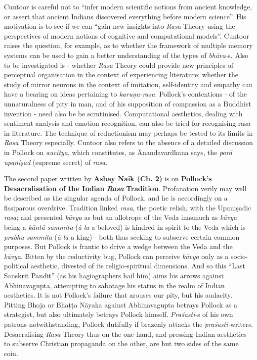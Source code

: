 Cuntoor is careful not to “infer modern scientific notions from ancient knowledge, or assert that ancient Indians discovered everything before modern science”. His motivation is to see if we can “gain new insights into \textsl{Rasa} Theory using the perspectives of modern notions of cognitive and computational models”. Cuntoor raises the question, for example, as to whether the framework of multiple memory systems can be used to gain a better understanding of the types of \textsl{bhāva}-s. Also to be investigated is - whether \textsl{Rasa} Theory could provide new principles of perceptual organisation in the context of experiencing literature; whether the study of mirror neurons in the context of imitation, self-identity and empathy can have a bearing on ideas pertaining to \textsl{karuṇa-rasa}. Pollock's contentions - of the unnaturalness of pity in man, and of his supposition of compassion as a Buddhist invention - need also be be scrutinised. Computational aesthetics, dealing with sentiment analysis and emotion recognition, can also be tried for recognising rasa in literature. The technique of reductionism may perhaps be tested to its limits in \textsl{Rasa} Theory especially. Cuntoor also refers to the absence of a detailed discussion in Pollock on \textsl{aucitya}, which constitutes, as Ānandavardhana says, the \textsl{parā upaniṣad} (supreme secret) of \textsl{rasa}.

The second paper written by {\bf Ashay Naik (Ch. 2)} is on {\bf Pollock's Desacralisation of the Indian} {\sl\bfseries Rasa} {\bf Tradition}. Profanation verily may well be described as the singular agenda of Pollock, and he is accordingly on a fissiparous overdrive. Tradition linked \textsl{rasa}, the poetic relish, with the Upaniṣadic \textsl{rasa}; and presented \textsl{kāvya} as but an allotrope of the Veda inasmuch as \textsl{kāvya} being a \textsl{kāntā-sammita} (\textsl{à la} a beloved) is kindred in spirit to the Veda which is \textsl{prabhu-sammita} (\textsl{à la} a king) - both thus seeking to subserve certain common purposes. But Pollock is frantic to drive a wedge between the Veda and the \textsl{kāvya}. Bitten by the reductivity bug, Pollock can perceive \textsl{kāvya} only as a socio-political aesthetic, divested of its religio-spiritual dimensions. And so this “Last Sanskrit Pandit” (as his hagiographers hail him) aims his arrows against Abhinavagupta, attempting to sabotage his status in the realm of Indian aesthetics. It is not Pollock's failure that arouses our pity, but his audacity. Pitting Bhoja or Bhaṭṭa Nāyaka against Abhinavagupta betrays Pollock as a strategist, but also ultimately betrays Pollock himself. \textsl{Praśasti}-s of his own patrons notwithstanding, Pollock dutifully if brazenly attacks the \textsl{praśasti}-writers. Desacralising \textsl{Rasa} Theory thus on the one hand, and pressing Indian aesthetics to subserve Christian propaganda on the other, are but two sides of the same coin.

